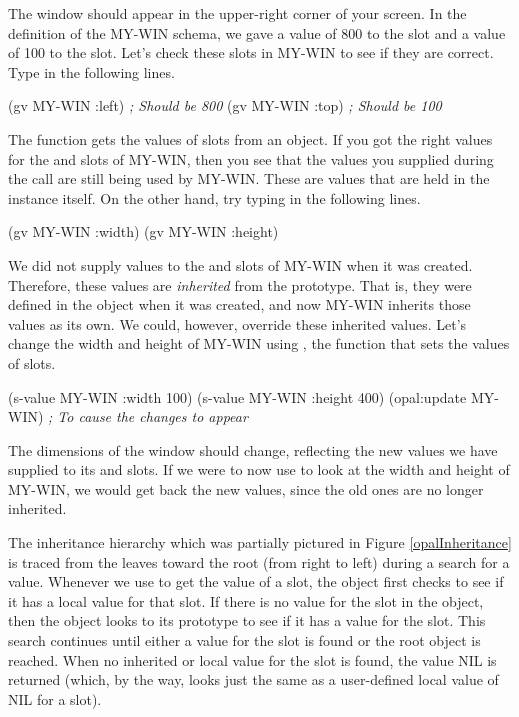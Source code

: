The window should appear in the upper-right corner of your screen.
In the definition of the MY-WIN schema, we gave a value of 800 to the
 slot and a value of 100 to the  slot.  Let's check
these slots in MY-WIN to see if they are correct.  Type in the
following lines.

\begin{programexample}
(gv MY-WIN :left)    {\it ; Should be 800}
(gv MY-WIN :top)     {\it ; Should be 100}
\end{programexample}

The function  gets the values of slots from an object.
If you got the right values for the  and  slots of
MY-WIN, then you see that the values you supplied during the
 call are still being used by MY-WIN.  These are values
that are held in the instance itself.  On the other hand, try typing
in the following lines.

\begin{programexample}
(gv MY-WIN :width)
(gv MY-WIN :height)
\end{programexample}

We did not supply values to the  and  slots of
MY-WIN when it was created.  Therefore, these values are {\it inherited}
from the prototype.  That is, they were defined in the
 object when it was created, and now MY-WIN
inherits those values as its own.  We could, however, override these
inherited values.  Let's change the width and height of MY-WIN using
, the function that sets the values of slots.

\begin{programexample}
(s-value MY-WIN :width 100)
(s-value MY-WIN :height 400)
(opal:update MY-WIN)  {\it ; To cause the changes to appear}
\end{programexample}

The dimensions of the window should change, reflecting the new values
we have supplied to its  and  slots.  If we
were to now use  to look at the width and height of
MY-WIN, we would get back the new values, since the old ones are no
longer inherited.

The inheritance hierarchy which was partially pictured in Figure
\ref{opalInheritance} is traced from the leaves toward the root
(from right to left) during a search for a value.
Whenever we use  to get the value of a slot, the object
first checks to see if it has a local value for that slot.  If there
is no value for the slot in the object, then the object looks to its
prototype to see if it has a value for the slot.  This search
continues until either a value for the slot is found or the root
object is reached.  When no inherited or local value for the slot is
found, the value NIL is returned (which, by the way, looks just the
same as a user-defined local value of NIL for a slot).

